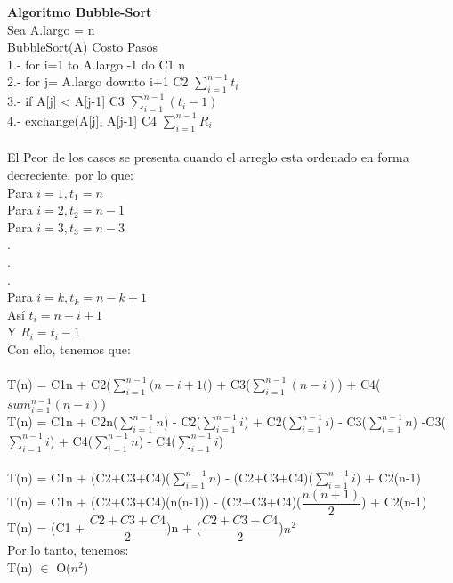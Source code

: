 \documentclass[spanish]{article}
\begin{document}
{	{\Large{\bf Algoritmo Bubble-Sort}}\\
	Sea A.largo = n \\
	BubbleSort(A)	 \hspace{6cm}  Costo	 \hspace{2.5cm} 						Pasos \\
1.- \hspace{0.7cm}		for i=1 to A.largo -1 do			 \hspace{3.2cm}C1	\hspace{3cm}n \\
2.- \hspace{0.7cm}			for j= A.largo downto i+1		 \hspace{2.8cm}C2	\hspace{3cm}$\sum_{i=1}^{n-1} t_i$	\\
3.- \hspace{0.7cm} \hspace{0.7cm}				if A[j] < A[j-1] \hspace{4cm}C3	\hspace{3cm} $\sum_{i=1}^{n-1} (t_i-1)$\\
4.- \hspace{0.7cm} \hspace{0.7cm} \hspace{0.7cm}					exchange(A[j], A[j-1]	 \hspace{2cm}C4	\hspace{3cm}$\sum_{i=1}^{n-1} R_i$\\
\\
El Peor de los casos se presenta cuando el arreglo esta ordenado en forma decreciente, por lo que: \\
Para \(i = 1,       t_1 =n\)	\\
Para \(i = 2, t_2 =n-1\)	\\
Para \(i = 3, t_3 =n-3\)	\\
.\\
.\\
.\\
Para \(i = k,    t_k =n-k+1\)	\\
Así  \(t_i =n-i+1\)	\\
Y  \(R_i = t_i -1\)	\\
Con ello, tenemos que:\\
\\
T(n) = C1n + C2($\sum_{i=1}^{n-1}( n-i+1($) + C3($ \sum_{i=1}^{n-1} (n-i) $) + C4($sum_{i=1}^{n-1}( n-i)$)\\
T(n) = C1n + C2n($\sum_{i=1}^{n-1} n$) - C2($\sum_{i=1}^{n-1} i $)  + C2($\sum_{i=1}^{n-1} i $) - C3($\sum_{i=1}^{n-1} n $) -C3($\sum_{i=1}^{n-1} i $) + C4($\sum_{i=1}^{n-1} n $) - C4($\sum_{i=1}^{n-1} i $)\\
\\ 
T(n) = C1n + (C2+C3+C4)($\sum_{i=1}^{n-1} n$) - (C2+C3+C4)($\sum_{i=1}^{n-1} i$) + C2(n-1) \\
T(n) = C1n + (C2+C3+C4)(n(n-1)) - (C2+C3+C4)($\dfrac{n(n+1)}{2}$) + C2(n-1) \\
T(n) = (C1 + $\dfrac{C2+C3+C4}{2}$)n + ($\dfrac{C2+C3+C4}{2}$)$n^{2}$ \\
Por lo tanto, tenemos:\\
T(n) $\in$ O($n^{2}$)

}
\end{document}
